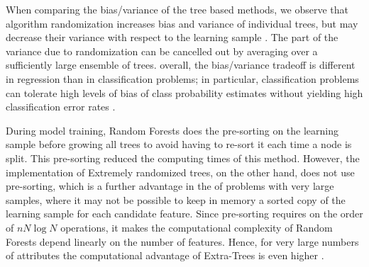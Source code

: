 When comparing the bias/variance of the tree based methods, we observe that algorithm randomization increases bias and variance of individual trees, but  may decrease their variance with respect to the learning sample \citep{geurts2006extremely}. The part of the variance due to randomization can be cancelled out by averaging over a
sufficiently large ensemble of trees. overall, the bias/variance tradeoff is different in regression than in classification problems;
in particular, classification problems can tolerate high levels of bias of class probability estimates without yielding high classification error rates \citep{geurts2006extremely}. 

During model training, Random Forests does the pre-sorting on the learning sample before growing all trees to avoid having to re-sort it each time a node is split. This pre-sorting reduced the computing times of this method. However, the implementation of Extremely randomized trees, on the other hand, does not use pre-sorting, which is a further advantage in the of problems with very large samples, where it may not be possible to keep in memory a sorted copy of the learning sample for each candidate feature. Since pre-sorting requires on the order of $nN\log N$ operations, it makes the
computational complexity of Random Forests depend linearly on the number of features. Hence, for very large numbers of attributes the computational advantage of Extra-Trees is even higher \citep{geurts2006extremely}.



